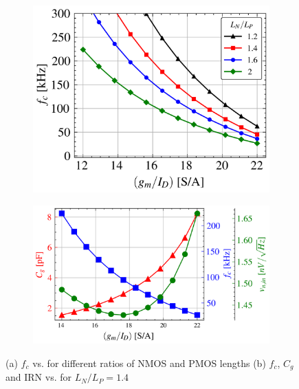 \begin{figure}[!h]
        \centering
        \begin{subfigure}[c]{0.42\linewidth}
            \centering
            \includegraphics[width=\linewidth]{img/flicker.png}
            \caption[]%
            {{\small }}
            \label{fig:flicker}
        \end{subfigure}
        \hfill
        \begin{subfigure}[c]{0.53\linewidth}  
            \centering 
            \includegraphics[width=\linewidth]{img/trade-off.png}
            \caption[]%
            {{\small }}
            \label{fig:trade-off}
        \end{subfigure}
        \caption[ Don't write caption here ]
        {\small (a) {$f_{c}$ vs. \gmID for different ratios of NMOS and PMOS lengths } (b) $f_{c}$, $C_{g}$ and IRN vs. \gmID for $L_N/L_P=1.4$} 
        \label{fig:flicker and trade off}
\end{figure}

